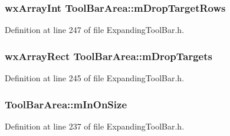 \subsubsection[{\texorpdfstring{m\+Drop\+Target\+Rows}{mDropTargetRows}}]{\setlength{\rightskip}{0pt plus 5cm}wx\+Array\+Int Tool\+Bar\+Area\+::m\+Drop\+Target\+Rows\hspace{0.3cm}{\ttfamily [protected]}}\hypertarget{class_tool_bar_area_a2825cb370b5bb5acb9d69f4f899ce4f8}{}\label{class_tool_bar_area_a2825cb370b5bb5acb9d69f4f899ce4f8}


Definition at line 247 of file Expanding\+Tool\+Bar.\+h.

\subsubsection[{\texorpdfstring{m\+Drop\+Targets}{mDropTargets}}]{\setlength{\rightskip}{0pt plus 5cm}wx\+Array\+Rect Tool\+Bar\+Area\+::m\+Drop\+Targets\hspace{0.3cm}{\ttfamily [protected]}}\hypertarget{class_tool_bar_area_ad836e795119d4038bb80dbb869196b0e}{}\label{class_tool_bar_area_ad836e795119d4038bb80dbb869196b0e}


Definition at line 245 of file Expanding\+Tool\+Bar.\+h.

\subsubsection[{\texorpdfstring{m\+In\+On\+Size}{mInOnSize}}]{ Tool\+Bar\+Area\+::m\+In\+On\+Size\hspace{0.3cm}{\ttfamily [protected]}}\hypertarget{class_tool_bar_area_a675d75e03b7352aca197d4783ba67eef}{}\label{class_tool_bar_area_a675d75e03b7352aca197d4783ba67eef}


Definition at line 237 of file Expanding\+Tool\+Bar.\+h.

